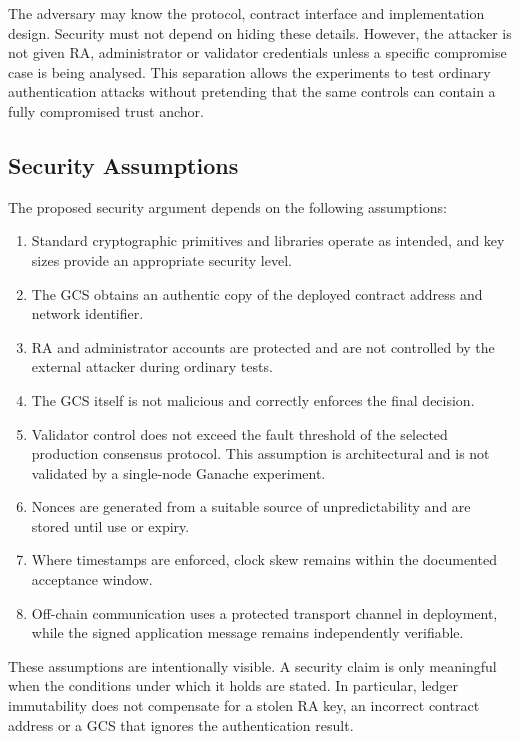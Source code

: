 The adversary may know the protocol, contract interface and implementation design. Security must not depend on hiding these details. However, the attacker is not given RA, administrator or validator credentials unless a specific compromise case is being analysed. This separation allows the experiments to test ordinary authentication attacks without pretending that the same controls can contain a fully compromised trust anchor.

\subsection{Security Assumptions}
\label{subsec:security-assumptions}

The proposed security argument depends on the following assumptions:

\begin{enumerate}
    \item Standard cryptographic primitives and libraries operate as intended, and key sizes provide an appropriate security level.
    \item The GCS obtains an authentic copy of the deployed contract address and network identifier.
    \item RA and administrator accounts are protected and are not controlled by the external attacker during ordinary tests.
    \item The GCS itself is not malicious and correctly enforces the final decision.
    \item Validator control does not exceed the fault threshold of the selected production consensus protocol. This assumption is architectural and is not validated by a single-node Ganache experiment.
    \item Nonces are generated from a suitable source of unpredictability and are stored until use or expiry.
    \item Where timestamps are enforced, clock skew remains within the documented acceptance window.
    \item Off-chain communication uses a protected transport channel in deployment, while the signed application message remains independently verifiable.
\end{enumerate}

These assumptions are intentionally visible. A security claim is only meaningful when the conditions under which it holds are stated. In particular, ledger immutability does not compensate for a stolen RA key, an incorrect contract address or a GCS that ignores the authentication result.

